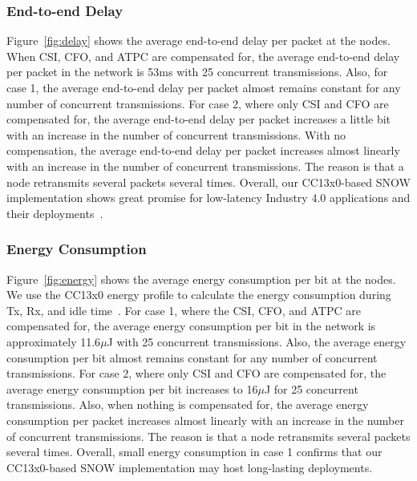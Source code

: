 \subsubsection{End-to-end Delay}
Figure~\ref{fig:delay} shows the average end-to-end delay per packet at the nodes. When CSI, CFO, and ATPC are compensated for, the average end-to-end delay per packet in the network is 53ms with 25 concurrent transmissions. Also, for case 1, the average end-to-end delay per packet almost remains constant for any number of concurrent transmissions. For case 2, where only CSI and CFO are compensated for, the average end-to-end delay per packet increases a little bit with an increase in the number of concurrent transmissions. With no compensation, the average end-to-end delay per packet increases almost linearly with an increase in the number of concurrent transmissions. The reason is that a node retransmits several packets several times.  
Overall, our CC13x0-based SNOW implementation shows great promise for low-latency Industry 4.0 applications and their deployments~\cite{modekurthy2018utilization}.




\subsubsection{Energy Consumption}
Figure~\ref{fig:energy} shows the average energy consumption per bit at the nodes. We use the CC13x0 energy profile to calculate the energy consumption during Tx, Rx, and idle time~\cite{cc1350}.
For case 1, where the CSI, CFO, and ATPC are compensated for, the average energy consumption per bit in the network is approximately 11.6$\mu$J with 25 concurrent transmissions. Also, the average energy consumption per bit almost remains constant for any number of concurrent transmissions. For case 2, where only CSI and CFO are compensated for, the average energy consumption per bit increases to 16$\mu$J for 25 concurrent transmissions. Also, when nothing is compensated for, the average energy consumption per packet increases almost linearly with an increase in the number of concurrent transmissions. The reason is that a node retransmits several packets several times. Overall, small energy consumption in case 1 confirms that our CC13x0-based SNOW implementation may host long-lasting deployments.


